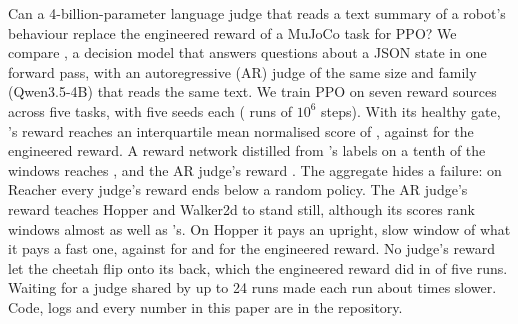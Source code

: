 Can a 4-billion-parameter language judge that reads a text summary of a robot's behaviour replace the engineered reward
of a MuJoCo task for PPO? We compare \kev{}, a decision model that answers questions about a JSON state in one forward
pass, with an autoregressive (AR) judge of the same size and family (Qwen3.5-4B) that reads the same text. We train PPO
on seven reward sources across five tasks, with five seeds each ( runs of $10^6$ steps). With its healthy
gate, \kev{}'s reward reaches an interquartile mean normalised score of 
, against  for the engineered reward. A reward network
distilled from \kev{}'s labels on a tenth of the windows reaches , and the AR judge's reward
. The aggregate hides a failure: on Reacher every judge's reward ends below a random policy. The AR
judge's reward teaches Hopper and Walker2d to stand still, although its scores rank windows almost as well as \kev{}'s.
On Hopper it pays an upright, slow window  of what it pays a fast one, against
 for \kev{} and  for the engineered reward. No judge's reward let
the cheetah flip onto its back, which the engineered reward did in  of five runs. Waiting for a
judge shared by up to 24 runs made each run about  times slower. Code, logs and every number in this paper are in the repository.
